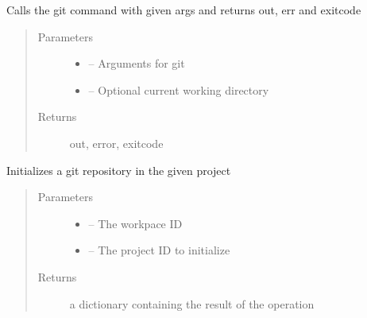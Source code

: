 \documentclass[letterpaper,10pt,english]{sphinxmanual}
\begin{document}

\begin{fulllineitems}
\label{_source/son_editor.impl:son_editor.impl.gitimpl.git_command}
Calls the git command with given args and returns out, err and exitcode
\begin{quote}\begin{description}
\item[{Parameters}] \leavevmode\begin{itemize}
\item {} 
 -- Arguments for git

\item {} 
 -- Optional current working directory

\end{itemize}

\item[{Returns}] \leavevmode
out, error, exitcode

\end{description}\end{quote}

\end{fulllineitems}


\begin{fulllineitems}
\label{_source/son_editor.impl:son_editor.impl.gitimpl.init}
Initializes a git repository in the given project
\begin{quote}\begin{description}
\item[{Parameters}] \leavevmode\begin{itemize}
\item {} 
 -- The workpace ID

\item {} 
 -- The project ID to initialize

\end{itemize}

\item[{Returns}] \leavevmode
a dictionary containing the result of the operation

\end{description}\end{quote}

\end{fulllineitems}
\end{document}
